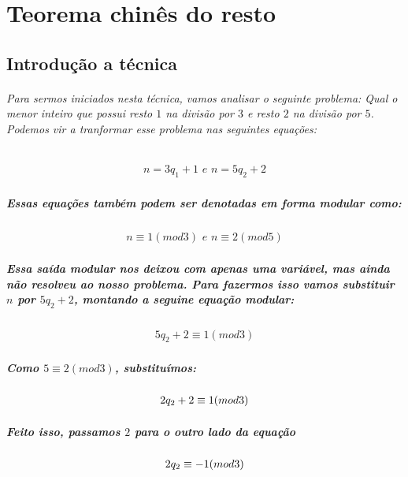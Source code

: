 \chapter {Teorema chin\^es do resto}
\label{TCR}

\section{Introdu\c{c}\~ao a t\'ecnica}

\subparagraph{
Para sermos iniciados nesta t\'ecnica, vamos analisar o seguinte problema: Qual o menor inteiro que possui resto $1$ na divis\~ao por $3$ e resto $2$ na divis\~ao por $5$. Podemos vir a tranformar esse problema nas seguintes equa\c{c}\~oes:
}
\[	
	\begin{array}{c}
		\textit{$n = 3q_1 + 1$ e $n = 5q_2 + 2$}
	\end{array}
\]
\paragraph{
Essas equa\c{c}\~oes tamb\'em podem ser denotadas em forma modular como:
}
\[	
	\begin{array}{c}
		\textit{$n \equiv 1 (mod 3)$ e $n \equiv 2 (mod 5)$}
	\end{array}
\]
\paragraph{
Essa sa\'ida modular nos deixou com apenas uma vari\'avel, mas ainda n\~ao resolveu ao nosso problema. Para fazermos isso vamos substituir $n$ por $5q_2 + 2$, montando a seguine equa\c{c}\~ao modular:
}
\[	
	\begin{array}{c}
		\textit{$5q_2 + 2 \equiv 1 (mod 3)$}
	\end{array}
\]
\paragraph{
Como $5 \equiv 2(mod 3)$, substitu\'imos:
}
\[	
	\begin{array}{c}
		\textit{$ 2q_2 + 2 \equiv 1 (mod 3)$}
	\end{array}
\]
\paragraph{
Feito isso, passamos $2$ para o outro lado da equa\c{c}\~ao
}
\[	
	\begin{array}{c}
		\textit{$ 2q_2  \equiv -1 (mod 3)$}
	\end{array}
\]
